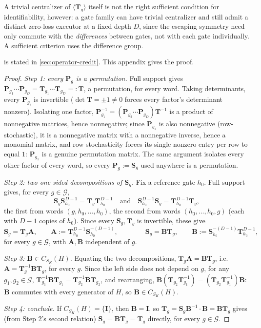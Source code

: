 A trivial centralizer of $\langle\bm T_g\rangle$ itself is not the right
sufficient condition for identifiability, however: a gate family can have
trivial centralizer and still admit a distinct zero-loss executor at a
fixed depth $D$, since the escaping symmetry need only commute with the
\emph{differences} between gates, not with each gate individually. A
sufficient criterion uses the difference group.

 is stated in \cref{sec:operator-credit}.
This appendix gives the proof.
\begin{proof}
\emph{Step 1: every $\bm P_g$ is a permutation.} Full support gives
$\bm P_{g_1}\cdots\bm P_{g_D}=\bm T_{g_1}\cdots\bm T_{g_D}=:\bm T$, a
permutation, for every word. Taking determinants, every $\bm P_{g_i}$ is
invertible ($\det\bm T=\pm1\ne0$ forces every factor's determinant nonzero).
Isolating one factor, $\bm P_{g_1}^{-1}=(\bm P_{g_2}\cdots\bm P_{g_D})\bm T^{-1}$
is a product of nonnegative matrices, hence nonnegative; since $\bm P_{g_1}$
is also nonnegative (row-stochastic), it is a nonnegative matrix with a
nonnegative inverse, hence a monomial matrix, and row-stochasticity forces
its single nonzero entry per row to equal $1$: $\bm P_{g_1}$ is a genuine
permutation matrix. The same argument isolates every other factor of every
word, so every $\bm P_g:=\bm S_g$ used anywhere is a permutation.

\emph{Step 2: two one-sided decompositions of $\bm S_g$.} Fix a reference
gate $h_0$. Full support gives, for every $g\in\mathcal G$,
\[
 \bm S_g\bm S_{h_0}^{D-1}=\bm T_g\bm T_{h_0}^{D-1}
 \quad\text{and}\quad
 \bm S_{h_0}^{D-1}\bm S_g=\bm T_{h_0}^{D-1}\bm T_g,
\]
the first from words $(g,h_0,\ldots,h_0)$, the second from words
$(h_0,\ldots,h_0,g)$ (each with $D-1$ copies of $h_0$). Since every
$\bm S_g,\bm T_g$ is invertible, these give
\[
 \bm S_g=\bm T_g\bm A,\qquad \bm A:=\bm T_{h_0}^{D-1}\bm S_{h_0}^{-(D-1)},
 \qquad\qquad
 \bm S_g=\bm B\bm T_g,\qquad \bm B:=\bm S_{h_0}^{-(D-1)}\bm T_{h_0}^{D-1},
\]
for every $g\in\mathcal G$, with $\bm A,\bm B$ independent of $g$.

\emph{Step 3: $\bm B\in C_{S_K}(H)$.} Equating the two decompositions,
$\bm T_g\bm A=\bm B\bm T_g$, i.e.\ $\bm A=\bm T_g^{-1}\bm B\bm T_g$, for
every $g$. Since the left side does not depend on $g$, for any
$g_1,g_2\in\mathcal G$, $\bm T_{g_1}^{-1}\bm B\bm T_{g_1}=\bm T_{g_2}^{-1}
\bm B\bm T_{g_2}$, and rearranging,
$\bm B(\bm T_{g_2}\bm T_{g_1}^{-1})=(\bm T_{g_2}\bm T_{g_1}^{-1})\bm B$: $\bm B$
commutes with every generator of $H$, so $\bm B\in C_{S_K}(H)$.

\emph{Step 4: conclude.} If $C_{S_K}(H)=\{\bm I\}$, then $\bm B=\bm I$, so
$\bm T_g=\bm S_g\bm B^{-1}\cdot\bm B=\bm B\bm T_g$ gives (from Step 2's second
relation) $\bm S_g=\bm B\bm T_g=\bm T_g$ directly, for every $g\in\mathcal G$.
\end{proof}

